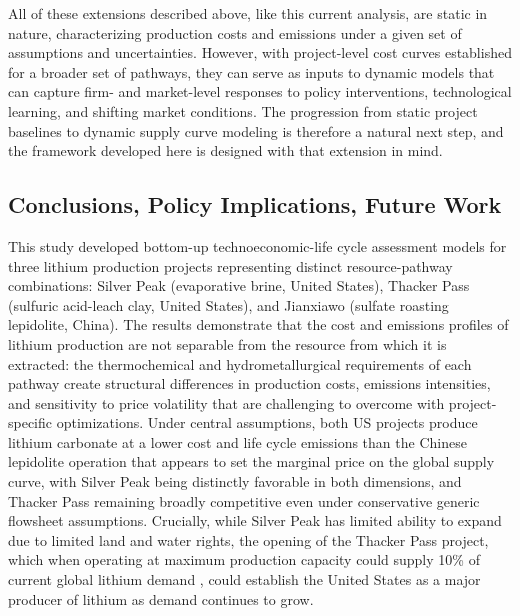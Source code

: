All of these extensions described above, like this current analysis, are static in nature, characterizing production costs and emissions under a given set of assumptions and uncertainties. However, with project-level cost curves established for a broader set of pathways, they can serve as inputs to dynamic models that can capture firm- and market-level responses to policy interventions, technological learning, and shifting market conditions. The progression from static project baselines to dynamic supply curve modeling is therefore a natural next step, and the framework developed here is designed with that extension in mind.

\subsection{Conclusions, Policy Implications, Future Work}

This study developed bottom-up technoeconomic-life cycle assessment models for three lithium production projects representing distinct resource-pathway combinations: Silver Peak (evaporative brine, United States), Thacker Pass (sulfuric acid-leach clay, United States), and Jianxiawo (sulfate roasting lepidolite, China). The results demonstrate that the cost and emissions profiles of lithium production are not separable from the resource from which it is extracted: the thermochemical and hydrometallurgical requirements of each pathway create structural differences in production costs, emissions intensities, and sensitivity to price volatility that are challenging to overcome with project-specific optimizations. Under central assumptions, both US projects produce lithium carbonate at a lower cost and life cycle emissions than the Chinese lepidolite operation that appears to set the marginal price on the global supply curve, with Silver Peak being distinctly favorable in both dimensions, and Thacker Pass remaining broadly competitive even under conservative generic flowsheet assumptions. Crucially, while Silver Peak has limited ability to expand due to limited land and water rights, the opening of the Thacker Pass project, which when operating at maximum production capacity could supply 10\% of current global lithium demand \cite{usgeologicalsurveyMineralCommoditySummaries2026}, could establish the United States as a major producer of lithium as demand continues to grow. 

